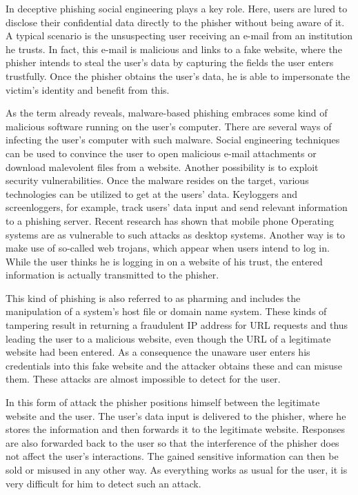 \begin{description}[leftmargin=0cm]
	\item[Deceptive Phishing] In deceptive phishing social engineering plays a key role. Here, users are lured to disclose their confidential data directly to the phisher without being aware of it. A typical scenario is the unsuspecting user receiving an e-mail from an institution he trusts. In fact, this e-mail is malicious and links to a fake website, where the phisher intends to steal the user's data by capturing the fields the user enters trustfully. Once the phisher obtains the user's data, he is able to impersonate the victim's identity and benefit from this.
	\item[Malware-Based Phishing] As the term already reveals, malware-based phishing embraces some kind of malicious software running on the user's computer. There are several ways of infecting the user's computer with such malware. Social engineering techniques can be used to convince the user to open malicious e-mail attachments or download malevolent files from a website. Another possibility is to exploit security vulnerabilities. Once the malware resides on the target, various technologies can be utilized to get at the users' data. Keyloggers and screenloggers, for example, track users' data input and send relevant information to a phishing server. Recent research has shown that mobile phone Operating systems are as vulnerable to such attacks as desktop systems. Another way is to make use of so-called web trojans, which appear when users intend to log in. While the user thinks he is logging in on a website of his trust, the entered information is actually transmitted to the phisher.
	\item[DNS Based Phishing] This kind of phishing is also referred to as pharming and includes the manipulation of a system's host file or domain name system. These kinds of tampering result in returning a fraudulent IP address for URL requests and thus leading the user to a malicious website, even though the URL of a legitimate website had been entered. As a consequence the unaware user enters his credentials into this fake website and the attacker obtains these and can misuse them. These attacks are almost impossible to detect for the user.
	\item[Man-in-the-Middle Phishing] In this form of attack the phisher positions himself between the legitimate website and the user. The user's data input is delivered to the phisher, where he stores the information and then forwards it to the legitimate website. Responses are also forwarded back to the user so that the interference of the phisher does not affect the user's interactions. The gained sensitive information can then be sold or misused in any other way. As everything works as usual for the user, it is very difficult for him to detect such an attack. 

\end{description}
